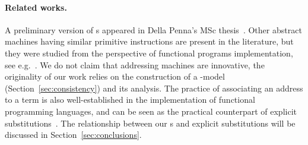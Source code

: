 \paragraph{Related works.} A preliminary version of \am s appeared in Della Penna's MSc thesis~\cite{DellaPennaTh}.
Other abstract machines having similar primitive instructions are present in the literature, but they were studied from the perspective of functional programs implementation,
see e.g.~\cite{FairbairnW87}. We do not claim that addressing machines are innovative, the originality of our work relies on the construction of a \lam-model (Section~\ref{sec:consistency}) and its analysis.
The practice of associating an address to a term is also well-established in the implementation of functional programming languages, and can be seen as the practical counterpart of explicit substitutions~\cite{LevyM99,BlancLM05,AccattoliCGC19}. The relationship between our \am s and explicit substitutions will be discussed  in Section~\ref{sec:conclusions}.
